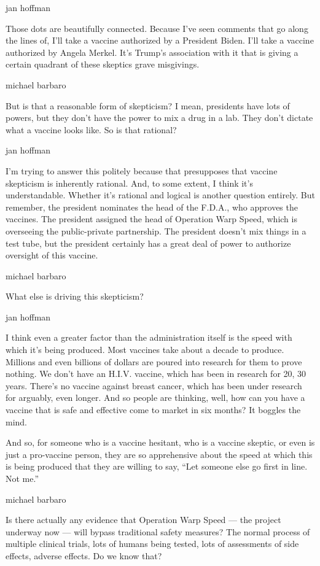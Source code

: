 jan hoffman

Those dots are beautifully connected. Because I've seen comments that go
along the lines of, I'll take a vaccine authorized by a President Biden.
I'll take a vaccine authorized by Angela Merkel. It's Trump's
association with it that is giving a certain quadrant of these skeptics
grave misgivings.

michael barbaro

But is that a reasonable form of skepticism? I mean, presidents have
lots of powers, but they don't have the power to mix a drug in a lab.
They don't dictate what a vaccine looks like. So is that rational?

jan hoffman

I'm trying to answer this politely because that presupposes that vaccine
skepticism is inherently rational. And, to some extent, I think it's
understandable. Whether it's rational and logical is another question
entirely. But remember, the president nominates the head of the F.D.A.,
who approves the vaccines. The president assigned the head of Operation
Warp Speed, which is overseeing the public-private partnership. The
president doesn't mix things in a test tube, but the president certainly
has a great deal of power to authorize oversight of this vaccine.

michael barbaro

What else is driving this skepticism?

jan hoffman

I think even a greater factor than the administration itself is the
speed with which it's being produced. Most vaccines take about a decade
to produce. Millions and even billions of dollars are poured into
research for them to prove nothing. We don't have an H.I.V. vaccine,
which has been in research for 20, 30 years. There's no vaccine against
breast cancer, which has been under research for arguably, even longer.
And so people are thinking, well, how can you have a vaccine that is
safe and effective come to market in six months? It boggles the mind.

And so, for someone who is a vaccine hesitant, who is a vaccine skeptic,
or even is just a pro-vaccine person, they are so apprehensive about the
speed at which this is being produced that they are willing to say,
``Let someone else go first in line. Not me.''

michael barbaro

Is there actually any evidence that Operation Warp Speed --- the project
underway now --- will bypass traditional safety measures? The normal
process of multiple clinical trials, lots of humans being tested, lots
of assessments of side effects, adverse effects. Do we know that?

